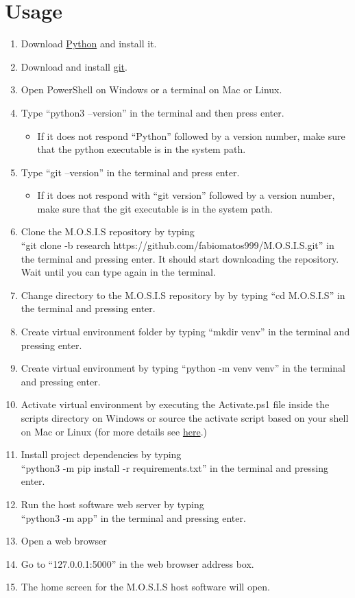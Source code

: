 \documentclass[12pt]{article}
\begin{document}
\section{Usage}
\begin{enumerate}
	\item Download \href{https://www.python.org/downloads/windows/}{Python} and install it.
	\item Download and install \href{https://git-scm.com/download/win}{git}.
	\item Open PowerShell on Windows or a terminal on Mac or Linux.
	\item Type ``python3 --version'' in the terminal and then press enter.
	      \begin{itemize}
		      \item If it does not respond ``Python'' followed by a version number, make sure that the python executable is in the system path.
	      \end{itemize}
	\item Type ``git --version'' in the terminal and press enter.
	      \begin{itemize}
		      \item If it does not respond with ``git version'' followed by a version number, make sure that the git executable is in the system path.
	      \end{itemize}
	\item Clone the M.O.S.I.S repository by typing\\ ``git clone -b research https://github.com/fabiomatos999/M.O.S.I.S.git'' in the terminal and pressing enter. It should start downloading the repository. Wait until you can type again in the terminal.
	\item Change directory to the M.O.S.I.S repository by by typing ``cd M.O.S.I.S'' in the terminal and pressing enter.
	\item Create virtual environment folder by typing ``mkdir venv'' in the terminal and pressing enter.
	\item Create virtual environment by typing ``python -m venv venv'' in the terminal and pressing enter.
	\item Activate virtual environment by executing the Activate.ps1 file inside the scripts directory on Windows or source the activate script based on your shell on Mac or Linux (for more details see \href{https://docs.python.org/3/library/venv.html#how-venvs-work}{here}.)
	\item Install project dependencies by typing\\ ``python3 -m pip install -r requirements.txt'' in the terminal and pressing enter.
	\item Run the host software web server by typing\\ ``python3 -m app'' in the terminal and pressing enter.
	\item Open a web browser
	\item Go to ``127.0.0.1:5000'' in the web browser address box.
	\item The home screen for the M.O.S.I.S host software will open.
\end{enumerate}
\appendix
\end{document}
